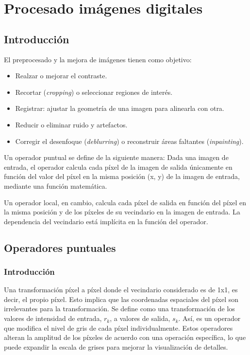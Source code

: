 \chapter{Procesado imágenes digitales}
\section{Introducción}
El preprocesado y la mejora de imágenes tienen como objetivo:
\begin{itemize}
\item Realzar o mejorar el contraste.
\item Recortar (\textit{cropping}) o seleccionar regiones de interés.
\item Registrar: ajustar la geometría de una imagen para alinearla con otra.
\item Reducir o eliminar ruido y artefactos.
\item Corregir el desenfoque (\textit{deblurring}) o reconstruir áreas faltantes (\textit{inpainting}).
\end{itemize}

Un operador puntual se define de la siguiente manera:
Dada una imagen de entrada, el operador calcula cada píxel de la imagen de salida únicamente en función del valor del píxel en la misma posición (x, y) de la imagen de entrada, mediante una función matemática.

Un operador local, en cambio, calcula cada píxel de salida en función del píxel en la misma posición y de los píxeles de su vecindario en la imagen de entrada. La dependencia del vecindario está implícita en la función del operador.

\section{Operadores puntuales}
\subsection{Introducción}
Una transformación píxel a píxel donde el vecindario considerado es de 1x1, es decir, el propio píxel. Esto implica que las coordenadas espaciales del píxel son irrelevantes para la transformación. Se define como una transformación de los valores de intensidad de entrada, $r_k$, a valores de salida, $s_k$. Así, es un operador que modifica el nivel de gris de cada píxel individualmente. Estos operadores alteran la amplitud de los píxeles de acuerdo con una operación específica, lo que puede expandir la escala de grises para mejorar la visualización de detalles.


